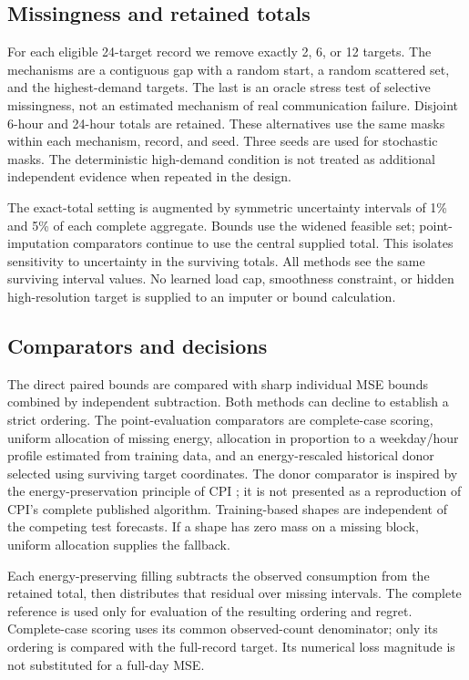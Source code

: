 \documentclass[12pt]{article}
\begin{document}
\subsection{Missingness and retained totals}
For each eligible 24-target record we remove exactly 2, 6, or 12 targets.
The mechanisms are a contiguous gap with a random start, a random scattered
set, and the highest-demand targets. The last is an oracle stress test of
selective missingness, not an estimated mechanism of real communication
failure. Disjoint 6-hour and 24-hour totals are retained. These alternatives
use the same masks within each mechanism, record, and seed. Three seeds
are used for stochastic masks. The deterministic high-demand condition is
not treated as additional independent evidence when repeated in the design.

The exact-total setting is augmented by symmetric uncertainty intervals of
1\% and 5\% of each complete aggregate. Bounds use the widened feasible
set; point-imputation comparators continue to use the central supplied
total. This isolates sensitivity to uncertainty in the surviving totals.
All methods see the same surviving interval values. No learned load cap,
smoothness constraint, or hidden high-resolution target is supplied to an
imputer or bound calculation.

\subsection{Comparators and decisions}
The direct paired bounds are compared with sharp individual MSE bounds
combined by independent subtraction. Both methods can decline to establish
a strict ordering. The point-evaluation comparators are complete-case
scoring, uniform allocation of missing energy, allocation in proportion to
a weekday/hour profile estimated from training data, and an energy-rescaled
historical donor selected using surviving target coordinates. The donor
comparator is inspired by the energy-preservation principle of CPI
\cite{cpi}; it is not presented as a reproduction of CPI's complete
published algorithm. Training-based shapes are independent of the competing
test forecasts. If a shape has zero mass on a missing block, uniform
allocation supplies the fallback.

Each energy-preserving filling subtracts the observed consumption from
the retained total, then distributes that residual over missing intervals.
The complete reference is used only for evaluation of the resulting
ordering and regret. Complete-case scoring uses its common observed-count
denominator; only its ordering is compared with the full-record target.
Its numerical loss magnitude is not substituted for a full-day MSE.
\end{document}
